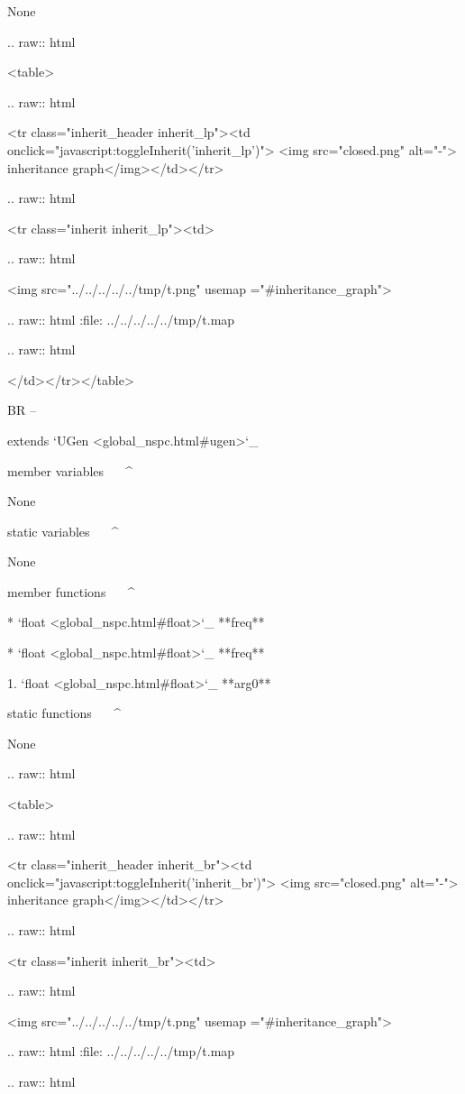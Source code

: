 	None


  .. raw:: html

   <table>


  .. raw:: html

   <tr class="inherit_header inherit_lp"><td onclick="javascript:toggleInherit('inherit_lp')"> <img src="closed.png" alt="-"> inheritance graph</img></td></tr>


  .. raw:: html

   <tr class="inherit inherit_lp"><td>


  .. raw:: html

   <img src="../../../../../tmp/t.png" usemap ="#inheritance_graph">


  .. raw:: html
   :file:   ../../../../../tmp/t.map


  .. raw:: html

   </td></tr></table>

BR
--

extends `UGen <global_nspc.html#ugen>`_ 

member variables
^^^^^^^^^^^^^^^^

	None

static variables
^^^^^^^^^^^^^^^^

	None

member functions
^^^^^^^^^^^^^^^^

	* `float <global_nspc.html#float>`_ **freq**

	* `float <global_nspc.html#float>`_ **freq**

		1. `float <global_nspc.html#float>`_ **arg0**

static functions
^^^^^^^^^^^^^^^^


	None


  .. raw:: html

   <table>


  .. raw:: html

   <tr class="inherit_header inherit_br"><td onclick="javascript:toggleInherit('inherit_br')"> <img src="closed.png" alt="-"> inheritance graph</img></td></tr>


  .. raw:: html

   <tr class="inherit inherit_br"><td>


  .. raw:: html

   <img src="../../../../../tmp/t.png" usemap ="#inheritance_graph">


  .. raw:: html
   :file:   ../../../../../tmp/t.map


  .. raw:: html

